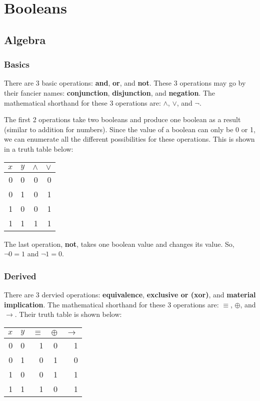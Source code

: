 \chapter{Booleans}

\section{Algebra}

\subsection{Basics}

There are 3 basic operations: \textbf{and}, \textbf{or}, and \textbf{not}. These
3 operations may go by their fancier names: \textbf{conjunction},
\textbf{disjunction}, and \textbf{negation}. The mathematical shorthand for
these 3 operations are: $\land$, $\lor$, and $\lnot$.

The first 2 operations take two booleans and produce one boolean as a result
(similar to addition for numbers). Since the value of a boolean can only be 0 or
1, we can enumerate all the different possibilities for these operations.  This
is shown in a truth table below:

\begin{center}
  \begin{tabular}{r r | r | r}
    $x$ & $y$ & $\land$ & $\lor$ \\
    \hline
    0 &   0 &       0 &      0 \\
    0 &   1 &       0 &      1 \\
    1 &   0 &       0 &      1 \\
    1 &   1 &       1 &      1 \\
  \end{tabular}
\end{center}

The last operation, \textbf{not}, takes one boolean value and changes its
value. So, $\lnot 0 = 1$ and $\lnot 1 = 0$.

\subsection{Derived}

There are 3 dervied operations: \textbf{equivalence}, \textbf{exclusive or
(xor)}, and \textbf{material implication}. The mathematical shorthand for these
3 operations are: $\equiv$, $\oplus$, and $\to$. Their truth table is shown
below:

\begin{center}
  \begin{tabular}{r r | r | r | r}
    $x$ & $y$ & $\equiv$ & $\oplus$ & $\to$ \\
    \hline
    0 &   0 &        1 &        0 &     1 \\
    0 &   1 &        0 &        1 &     0 \\
    1 &   0 &        0 &        1 &     1 \\
    1 &   1 &        1 &        0 &     1 \\
  \end{tabular}
\end{center}

